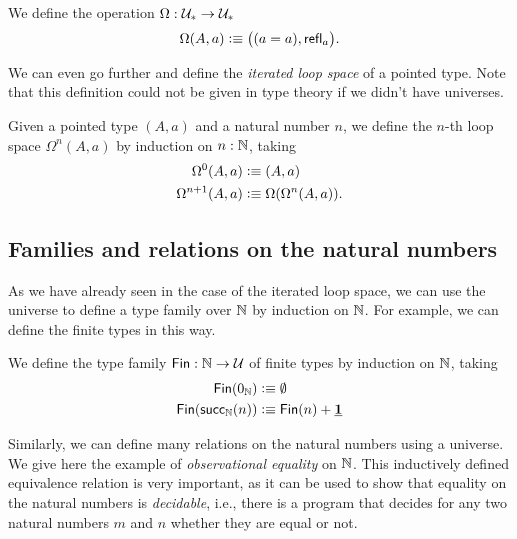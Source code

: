\begin{defn}
  We define the  operation $\Omega : \mathcal{U}_\ast \to \mathcal{U}_\ast$
  \begin{equation*}
    \Omega(A,a)\vcentcolon\equiv \big((a=a),\mathsf{refl}_{a}\big).
  \end{equation*}
\end{defn}

We can even go further and define the \emph{iterated loop space} of a pointed type. Note that this definition could not be given in type theory if we didn't have universes.

\begin{defn}
  Given a pointed type $(A,a)$ and a natural number $n$, we define the $n$-th loop space $\Omega^n(A,a)$ by induction on $n:{\mathbb{N}}$, taking
  \begin{align*}
    \Omega^0(A,a) & \vcentcolon\equiv (A,a) \\
    \Omega^{n+1}(A,a) & \vcentcolon\equiv \Omega(\Omega^n(A,a)).
  \end{align*}
\end{defn}

\subsection{Families and relations on the natural numbers}

As we have already seen in the case of the iterated loop space, we can use the universe to define a type family over ${\mathbb{N}}$ by induction on ${\mathbb{N}}$. For example, we can define the finite types in this way.

\begin{defn}\label{defn:fin}
We define the type family $\mathsf{Fin}:{\mathbb{N}}\to\mathcal{U}$ of finite types by induction on ${\mathbb{N}}$, taking
\begin{align*}
\mathsf{Fin}(0_{{\mathbb{N}}}) & \vcentcolon\equiv \emptyset \\
\mathsf{Fin}(\mathsf{succ}_{{\mathbb{N}}}(n)) & \vcentcolon\equiv \mathsf{Fin}(n)+\underline{\mathbf{1}}
\end{align*}
\end{defn}

Similarly, we can define many relations on the natural numbers using a universe. We give here the example of \emph{observational equality} on ${\mathbb{N}}$. This inductively defined equivalence relation is very important, as it can be used to show that equality on the natural numbers is \emph{decidable}, i.e., there is a program that decides for any two natural numbers $m$ and $n$ whether they are equal or not.

